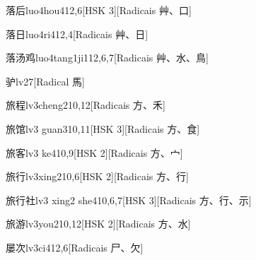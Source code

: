 \begin{entry}{落后}{luo4hou4}{12,6}[HSK 3][Radicais ⾋、⼝]
\end{entry}

\begin{entry}{落日}{luo4ri4}{12,4}[Radicais ⾋、⽇]
\end{entry}

\begin{entry}{落汤鸡}{luo4tang1ji1}{12,6,7}[Radicais ⾋、⽔、⿃]
\end{entry}

\begin{entry}{驴}{lv2}{7}[Radical ⾺]
\end{entry}

\begin{entry}{旅程}{lv3cheng2}{10,12}[Radicais ⽅、⽲]
\end{entry}

\begin{entry}{旅馆}{lv3 guan3}{10,11}[HSK 3][Radicais ⽅、⾷]
\end{entry}

\begin{entry}{旅客}{lv3 ke4}{10,9}[HSK 2][Radicais ⽅、⼧]
\end{entry}

\begin{entry}{旅行}{lv3xing2}{10,6}[HSK 2][Radicais ⽅、⾏]
\end{entry}

\begin{entry}{旅行社}{lv3 xing2 she4}{10,6,7}[HSK 3][Radicais ⽅、⾏、⽰]
\end{entry}

\begin{entry}{旅游}{lv3you2}{10,12}[HSK 2][Radicais ⽅、⽔]
\end{entry}

\begin{entry}{屡次}{lv3ci4}{12,6}[Radicais ⼫、⽋]
\end{entry}

